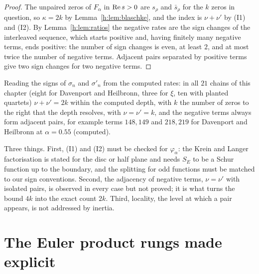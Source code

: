 \begin{proof}
The unpaired zeros of $F_\alpha$ in $\operatorname{Re} s>0$ are $s_\rho$ and $\bar s_\rho$ for the $k$ zeros in question, so $\kappa=2k$ by Lemma~\ref{h:lem:blaschke}, and the index is $\nu+\nu'$ by (I1) and (I2). By Lemma~\ref{h:lem:ratios} the negative rates are the sign changes of the interleaved sequence, which starts positive and, having finitely many negative terms, ends positive: the number of sign changes is even, at least $2$, and at most twice the number of negative terms. Adjacent pairs separated by positive terms give two sign changes for two negative terms.
\end{proof}

\begin{computation}\label{h:comp:inertia}
Reading the signs of $\sigma_n$ and $\sigma'_n$ from the computed rates: in all $21$ chains of this chapter (eight for Davenport and Heilbronn, three for $\xi$, ten with planted quartets) %
$\nu+\nu'=2k$ within the computed depth, with $k$ the number of zeros to the right that the depth resolves, with $\nu=\nu'=k$, and the negative terms always form adjacent pairs, for example terms $148,149$ and $218,219$ for Davenport and Heilbronn at $\alpha=0.55$ (computed). %
\end{computation}

\begin{remark}
Three things. First, (I1) and (I2) must be checked for $\varphi_\alpha$: the Krein and Langer factorisation is stated for the disc or half plane and needs $S_E$ to be a Schur function up to the boundary, and the splitting for odd functions must be matched to our sign conventions. Second, the adjacency of negative terms, $\nu=\nu'$ with isolated pairs, is observed in every case but not proved; it is what turns the bound $4k$ into the exact count $2k$. Third, locality, the level at which a pair appears, is not addressed by inertia.
\end{remark}

\section{The Euler product rungs made explicit}\label{h:sec:euler}

